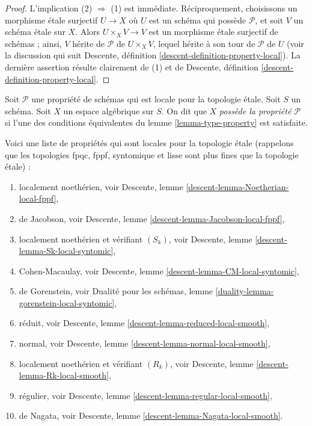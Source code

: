 \begin{proof}
L'implication (2) $\Rightarrow$ (1) est immédiate.
Réciproquement, choisissons un morphisme \'etale surjectif $U \to X$
où $U$ est un schéma qui possède $\mathcal{P}$, et soit $V$ un schéma \'etale sur
$X$. Alors $U \times_X V \rightarrow V$ est un morphisme \'etale surjectif
de schémas ; ainsi, $V$ hérite de $\mathcal{P}$ de $U \times_X V$, lequel
hérite à son tour de $\mathcal{P}$ de $U$ (voir la discussion qui suit
Descente, définition \ref{descent-definition-property-local}).
La dernière assertion résulte clairement de (1) et de
Descente, définition \ref{descent-definition-property-local}.
\end{proof}

\begin{definition}
\label{definition-type-property}
Soit $\mathcal{P}$ une propriété de schémas qui est
locale pour la topologie \'etale.
Soit $S$ un schéma.
Soit $X$ un espace algébrique sur $S$.
On dit que $X$ {\it possède la propriété $\mathcal{P}$}
si l'une des conditions équivalentes du
lemme \ref{lemma-type-property}
est satisfaite.
\end{definition}

\begin{remark}
\label{remark-list-properties-local-etale-topology}
Voici une liste de propriétés qui sont locales pour la topologie \'etale
(rappelons que les topologies fpqc, fppf, syntomique et lisse sont
plus fines que la topologie \'etale) :
\begin{enumerate}
\item localement noethérien, voir
Descente, lemme \ref{descent-lemma-Noetherian-local-fppf},
\item de Jacobson, voir
Descente, lemme \ref{descent-lemma-Jacobson-local-fppf},
\item localement noethérien et vérifiant $(S_k)$, voir
Descente, lemme \ref{descent-lemma-Sk-local-syntomic},
\item Cohen-Macaulay, voir
Descente, lemme \ref{descent-lemma-CM-local-syntomic},
\item de Gorenstein, voir
Dualité pour les schémas, lemme \ref{duality-lemma-gorenstein-local-syntomic},
\item réduit, voir
Descente, lemme \ref{descent-lemma-reduced-local-smooth},
\item normal, voir
Descente, lemme \ref{descent-lemma-normal-local-smooth},
\item localement noethérien et vérifiant $(R_k)$, voir
Descente, lemme \ref{descent-lemma-Rk-local-smooth},
\item régulier, voir
Descente, lemme \ref{descent-lemma-regular-local-smooth},
\item de Nagata, voir
Descente, lemme \ref{descent-lemma-Nagata-local-smooth}.
\end{enumerate}
\end{remark}

